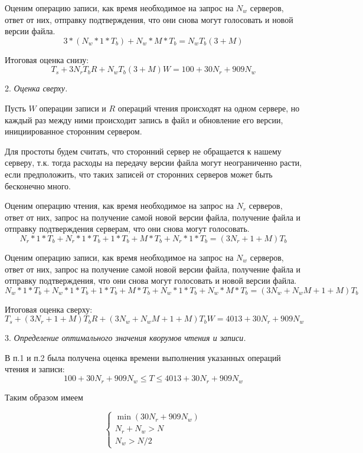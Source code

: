 Оценим операцию записи, как время необходимое на запрос на $N_w$ серверов,
ответ от них, отправку подтверждения, что они снова могут голосовать и новой
версии файла.
$$
3*(N_w * 1 * T_b) + N_w*M*T_b = N_wT_b(3 + M)
$$

Итоговая оценка снизу:
$$
T_s + 3N_rT_bR + N_wT_b(3 + M)W = 100 + 30N_r + 909N_w
$$

2. \textit{Оценка сверху.}

Пусть $W$ операции записи и $R$ операций чтения происходят на одном сервере, но
каждый раз между ними происходит запись в файл и обновление его версии,
инициированное сторонним сервером.

Для простоты будем считать, что сторонний сервер не обращается к нашему
серверу, т.к. тогда расходы на передачу версии файла могут неограниченно расти,
если предположить, что таких записей от сторонних серверов может быть
бесконечно много.

Оценим операцию чтения, как время необходимое на запрос на $N_r$ серверов,
ответ от них, запрос на получение самой новой версии файла, получение файла и
отправку подтверждения серверам, что они снова могут голосовать.
$$
N_r*1*T_b + N_r*1*T_b + 1*T_b + M*T_b + N_r*1*T_b = (3N_r + 1 + M)T_b
$$

Оценим операцию записи, как время необходимое на запрос на $N_w$ серверов,
ответ от них, запрос на получение самой новой версии файла, получение файла и
отправку подтверждения, что они снова могут голосовать и новой версии файла.
$$
N_w*1*T_b + N_w*1*T_b + 1*T_b + M*T_b + N_w*1*T_b + N_w*M*T_b = (3N_w + N_wM + 1 + M)T_b
$$

Итоговая оценка сверху:
$$
T_s + (3N_r + 1 + M)T_bR + (3N_w + N_wM + 1 + M)T_bW = 4013 + 30N_r + 909N_w
$$

3. \textit{Определение оптимального значения кворумов чтения и записи.}

В п.1 и п.2 была получена оценка времени выполнения указанных операций чтения и
записи:
$$
100 + 30N_r + 909N_w \le T \le 4013 + 30N_r + 909N_w
$$

Таким образом имеем

$$
\begin{cases}
    \min (30N_r + 909N_w)\\
    N_r + N_w > N\\
    N_w > N / 2
\end{cases}
$$





